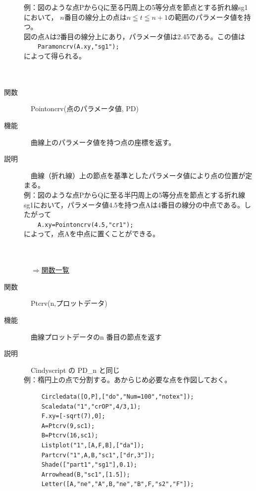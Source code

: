 \documentclass[papersize,a4paper,12pt,uplatex]{jsarticle}
\begin{document}
\begin{description}
例：図のような点PからQに至る円周上の5等分点を節点とする折れ線sg1において，
$n$番目の線分上の点は$n\leqq t\leqq n+1$の範囲のパラメータ値を持つ。\\
図の点$\mathrm{A}$は2番目の線分上にあり，パラメータ値は2.45である。この値は\\
　　\verb|Paramoncrv(A.xy,"sg1");|\\
によって得られる。\\
　\\
　　　　　　　\\

\hypertarget{pointcrv}{}
\item[関数]　Pointoncrv(点のパラメータ値, PD)
\item[機能]　曲線上のパラメータ値を持つ点の座標を返す。
\item[説明]　曲線（折れ線）上の節点を基準としたパラメータ値により点の位置が定まる。\\

例：図のような点$\mathrm{P}$から$\mathrm{Q}$に至る半円周上の5等分点を節点とする折れ線sg1において，パラメータ値$4.5$を持つ点$\mathrm{A}$は4番目の線分の中点である。したがって\\
　　\verb|A.xy=Pointoncrv(4.5,"cr1");|\\
によって，点Aを中点に置くことができる。\\
　\\
　　　　　　　　

\begin{flushright}　\hyperlink{functionlist}{$\Rightarrow$関数一覧}\end{flushright}
\newpage
\hypertarget{ptcrv}{}
\item[関数]　Ptcrv(n,プロットデータ)
\item[機能]　曲線プロットデータのn 番目の節点を返す
\item[説明]　Cindyscript の PD\_n と同じ\\

例：楕円上の点で分割する。あからじめ必要な点を作図しておく。
\begin{verbatim}
　　　Circledata([O,P],["do","Num=100","notex"]);
　　　Scaledata("1","crOP",4/3,1);
　　　F.xy=[-sqrt(7),0];
　　　A=Ptcrv(9,sc1);
　　　B=Ptcrv(16,sc1);
　　　Listplot("1",[A,F,B],["da"]);
　　　Partcrv("1",A,B,"sc1",["dr,3"]);
　　　Shade(["part1","sg1"],0.1);
　　　Arrowhead(B,"sc1",[1.5]);
　　　Letter([A,"ne","A",B,"ne","B",F,"s2","F"]);
\end{verbatim}
   　　　    　　　
   

\end{description}
\end{document}
